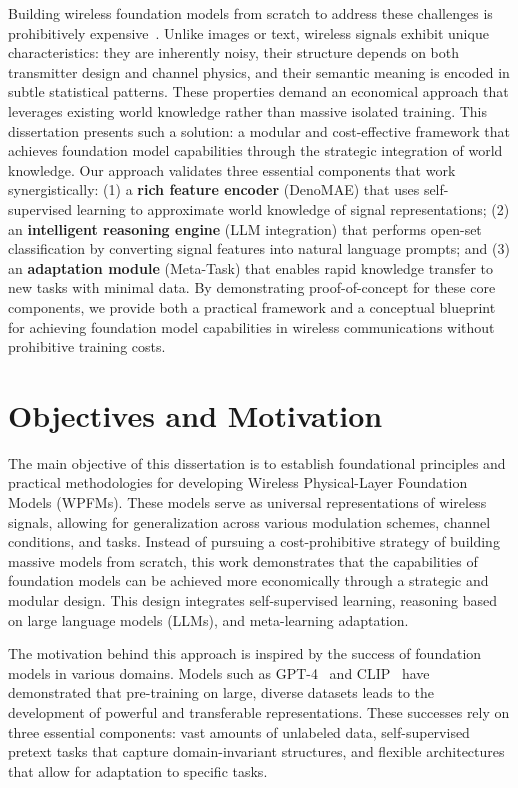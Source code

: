 Building wireless foundation models from scratch to address these challenges is prohibitively expensive~\cite{radford2021learning}. Unlike images or text, wireless signals exhibit unique characteristics: they are inherently noisy, their structure depends on both transmitter design and channel physics, and their semantic meaning is encoded in subtle statistical patterns. These properties demand an economical approach that leverages existing world knowledge rather than massive isolated training. This dissertation presents such a solution: a modular and cost-effective framework that achieves foundation model capabilities through the strategic integration of world knowledge. Our approach validates three essential components that work synergistically: (1) a \textbf{rich feature encoder} (DenoMAE) that uses self-supervised learning to approximate world knowledge of signal representations; (2) an \textbf{intelligent reasoning engine} (LLM integration) that performs open-set classification by converting signal features into natural language prompts; and (3) an \textbf{adaptation module} (Meta-Task) that enables rapid knowledge transfer to new tasks with minimal data. By demonstrating proof-of-concept for these core components, we provide both a practical framework and a conceptual blueprint for achieving foundation model capabilities in wireless communications without prohibitive training costs.

\section{Objectives and Motivation}
\label{sec:objective}

The main objective of this dissertation is to establish foundational principles and practical methodologies for developing Wireless Physical-Layer Foundation Models (WPFMs). These models serve as universal representations of wireless signals, allowing for generalization across various modulation schemes, channel conditions, and tasks. Instead of pursuing a cost-prohibitive strategy of building massive models from scratch, this work demonstrates that the capabilities of foundation models can be achieved more economically through a strategic and modular design. This design integrates self-supervised learning, reasoning based on large language models (LLMs), and meta-learning adaptation.

The motivation behind this approach is inspired by the success of foundation models in various domains. Models such as GPT-4~\cite{achiam2023gpt} and CLIP~\cite{radford2021learning} have demonstrated that pre-training on large, diverse datasets leads to the development of powerful and transferable representations. These successes rely on three essential components: vast amounts of unlabeled data, self-supervised pretext tasks that capture domain-invariant structures, and flexible architectures that allow for adaptation to specific tasks.

